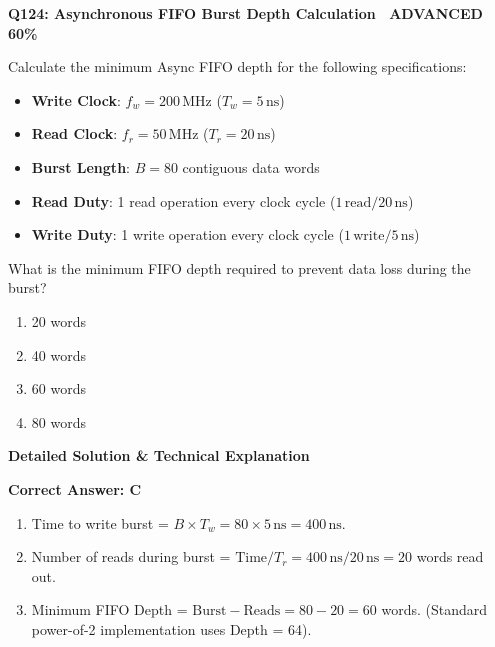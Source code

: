 \documentclass[11pt,a4paper]{article}
\newcommand{\badgeadv}{{\color{white}\colorbox{advred}{\bfseries\sffamily\tiny\ ADVANCED 60\%\ }}}
\newenvironment{qbox}[2]{%
  \begin{mdframed}[style=qstyle]%
  {\bfseries\sffamily\color{primaryblue}#1 \hfill #2}\par\vspace{2pt}%
}{%
  \end{mdframed}%
}
\newenvironment{ansbox}{%
  \begin{mdframed}[style=ansstyle]%
  {\bfseries\sffamily\color{ansgreen}\small Detailed Solution \& Technical Explanation}\par\vspace{2pt}\small%
}{%
  \end{mdframed}%
}
\begin{document}
\begin{qbox}{Q124: Asynchronous FIFO Burst Depth Calculation}{\badgeadv}
Calculate the minimum Async FIFO depth for the following specifications:
\begin{itemize}[leftmargin=1.5em]
  \item \textbf{Write Clock}: $f_w = 200\,\text{MHz}$ ($T_w = 5\,\text{ns}$)
  \item \textbf{Read Clock}: $f_r = 50\,\text{MHz}$ ($T_r = 20\,\text{ns}$)
  \item \textbf{Burst Length}: $B = 80$ contiguous data words
  \item \textbf{Read Duty}: 1 read operation every clock cycle ($1\,\text{read} / 20\,\text{ns}$)
  \item \textbf{Write Duty}: 1 write operation every clock cycle ($1\,\text{write} / 5\,\text{ns}$)
\end{itemize}
What is the minimum FIFO depth required to prevent data loss during the burst?
\begin{enumerate}[label=\textbf{\Alph*.}]
  \item 20 words
  \item 40 words
  \item 60 words
  \item 80 words
\end{enumerate}
\end{qbox}
\begin{ansbox}
\textbf{Correct Answer: C}

\begin{enumerate}[leftmargin=1.5em]
  \item Time to write burst = $B \times T_w = 80 \times 5\,\text{ns} = 400\,\text{ns}$.
  \item Number of reads during burst = $\text{Time} / T_r = 400\,\text{ns} / 20\,\text{ns} = 20$ words read out.
  \item Minimum FIFO Depth = $\text{Burst} - \text{Reads} = 80 - 20 = 60$ words.  
  (Standard power-of-2 implementation uses Depth = 64).
\end{enumerate}
\end{ansbox}
\end{document}
